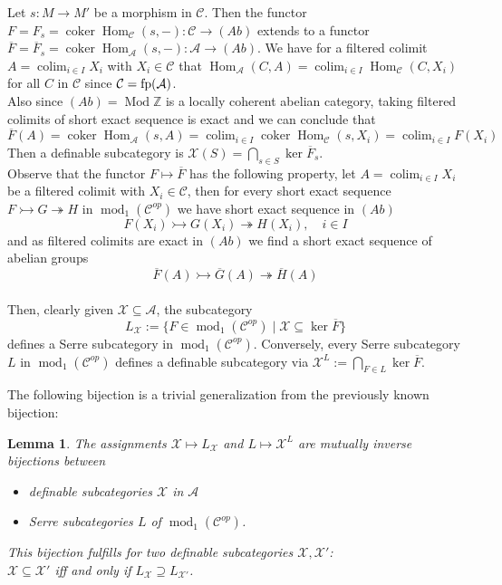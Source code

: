 \documentclass[11pt,a4paper]{amsart}
\theoremstyle{plain}
\newtheorem{lem}[thm]{Lemma}
\theoremstyle{definition}
\DeclareMathOperator{\Hom}{Hom}
\DeclareMathOperator{\modu}{mod}
\DeclareMathOperator{\Modu}{Mod}
\DeclareMathOperator{\Ker}{ker}
\DeclareMathOperator{\coKer}{coker}
\DeclareMathOperator*{\colim}{colim}
\newcommand{\defl}{\twoheadrightarrow}
\newcommand{\infl}{\rightarrowtail}
\newcommand{\mcA}{\mathcal{A}}
\newcommand{\mcC}{\mathcal{C}}
\newcommand{\mcX}{\mathcal{X}}
\begin{document}
Let $s\colon M \to M'$ be a morphism in $\mcC$.
Then the functor $F=F_s=\coKer \Hom_{\mcC} (s,-)\colon \mcC \to (Ab)$ extends to a functor $\overline{F}=\overline{F}_s=\coKer \Hom_{\mcA} (s,-)\colon \mcA \to (Ab)$. We have for a filtered colimit $A=\colim_{i\in I} X_i$ with $X_i\in \mcC$ that $\Hom_{\mcA} (C, A)=\colim_{i\in I} \Hom_{\mcC} (C, X_i)$ for all $C$ in $\mcC$ since $\mcC={\rm fp}(\mcA)$. \\
Also since $(Ab)= \Modu \mathbb{Z}$ is a locally coherent abelian category, taking filtered colimits of short exact sequence is exact and we can conclude that 
\[
\overline{F}(A) = \coKer \Hom_{\mcA}(s,A)= \colim_{i \in I} \coKer \Hom_{\mcC} (s, X_i) = \colim_{i \in I} F(X_i)
\]
Then a definable subcategory is $\mcX(S)=\bigcap_{s\in S} \Ker \overline{F}_s$.\\
Observe that the functor $F\mapsto \overline{F}$ has the following property, let $A=\colim_{i\in I}X_i$ be a filtered colimit with $X_i \in \mcC$, then for every short exact sequence $F\infl G \defl H$ in $\modu_1(\mcC^{op})$ we have short exact sequence in $(Ab)$
\[
F(X_i) \infl G(X_i) \defl H(X_i) , \quad i \in I
\]
and as filtered colimits are exact in $(Ab)$ we find a short exact sequence of abelian groups  
\[
\overline{F} (A) \infl \overline{G}(A) \defl \overline{H} (A) 
\]
\\
Then, clearly given $\mcX\subseteq \mcA$, the subcategory  
\[
L_{\mcX} := \{F\in \modu_1 (\mcC^{op}) \mid \mcX\subseteq \Ker \overline{F} \}
\]
defines a Serre subcategory in $\modu_1 (\mcC^{op})$.
Conversely, every Serre subcategory $L$ in $\modu_1 (\mcC^{op})$ defines a definable subcategory via 
$\mcX^L:=\bigcap_{F \in L} \Ker \overline{F}$.

The following bijection is a trivial generalization from the previously known bijection: 
\begin{lem} \label{SerreBij}
The assignments $\mcX\mapsto L_{\mcX}$ and $L \mapsto \mcX^L$ are mutually inverse bijections between 
\begin{itemize}
\item[(1)] definable subcategories $\mcX$ in $\mcA$
\item[(2)] Serre subcategories $L$ of $\modu_1(\mcC^{op})$.
\end{itemize}
This bijection fulfills for two definable subcategories $\mcX, \mcX'$:\\
$\mcX\subseteq \mcX'$ iff and only if $L_{\mcX} \supseteq L_{\mcX'}$. 
\end{lem}
\end{document}
